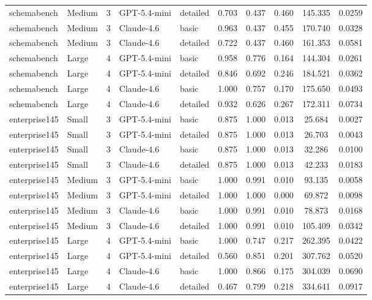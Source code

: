 \begin{table}[t]
\begin{tabular}{@{}l l r l l ccc cc@{}}
schemabench & Medium & 3 & GPT-5.4-mini & detailed & 0.703 & 0.437 & 0.460 & 145.335 & 0.0259 \\
schemabench & Medium & 3 & Claude-4.6 & basic & 0.963 & 0.437 & 0.455 & 170.740 & 0.0328 \\
schemabench & Medium & 3 & Claude-4.6 & detailed & 0.722 & 0.437 & 0.460 & 161.353 & 0.0581 \\
schemabench & Large & 4 & GPT-5.4-mini & basic & 0.958 & 0.776 & 0.164 & 144.304 & 0.0261 \\
schemabench & Large & 4 & GPT-5.4-mini & detailed & 0.846 & 0.692 & 0.246 & 184.521 & 0.0362 \\
schemabench & Large & 4 & Claude-4.6 & basic & 1.000 & 0.757 & 0.170 & 175.650 & 0.0493 \\
schemabench & Large & 4 & Claude-4.6 & detailed & 0.932 & 0.626 & 0.267 & 172.311 & 0.0734 \\
enterprise145 & Small & 3 & GPT-5.4-mini & basic & 0.875 & 1.000 & 0.013 & 25.684 & 0.0027 \\
enterprise145 & Small & 3 & GPT-5.4-mini & detailed & 0.875 & 1.000 & 0.013 & 26.703 & 0.0043 \\
enterprise145 & Small & 3 & Claude-4.6 & basic & 0.875 & 1.000 & 0.013 & 32.286 & 0.0100 \\
enterprise145 & Small & 3 & Claude-4.6 & detailed & 0.875 & 1.000 & 0.013 & 42.233 & 0.0183 \\
enterprise145 & Medium & 3 & GPT-5.4-mini & basic & 1.000 & 0.991 & 0.010 & 93.135 & 0.0058 \\
enterprise145 & Medium & 3 & GPT-5.4-mini & detailed & 1.000 & 1.000 & 0.000 & 69.872 & 0.0098 \\
enterprise145 & Medium & 3 & Claude-4.6 & basic & 1.000 & 0.991 & 0.010 & 78.873 & 0.0168 \\
enterprise145 & Medium & 3 & Claude-4.6 & detailed & 1.000 & 0.991 & 0.010 & 105.409 & 0.0342 \\
enterprise145 & Large & 4 & GPT-5.4-mini & basic & 1.000 & 0.747 & 0.217 & 262.395 & 0.0422 \\
enterprise145 & Large & 4 & GPT-5.4-mini & detailed & 0.560 & 0.851 & 0.201 & 307.762 & 0.0520 \\
enterprise145 & Large & 4 & Claude-4.6 & basic & 1.000 & 0.866 & 0.175 & 304.039 & 0.0690 \\
enterprise145 & Large & 4 & Claude-4.6 & detailed & 0.467 & 0.799 & 0.218 & 334.641 & 0.0917 \\
\bottomrule
\end{tabular}
\end{table}
